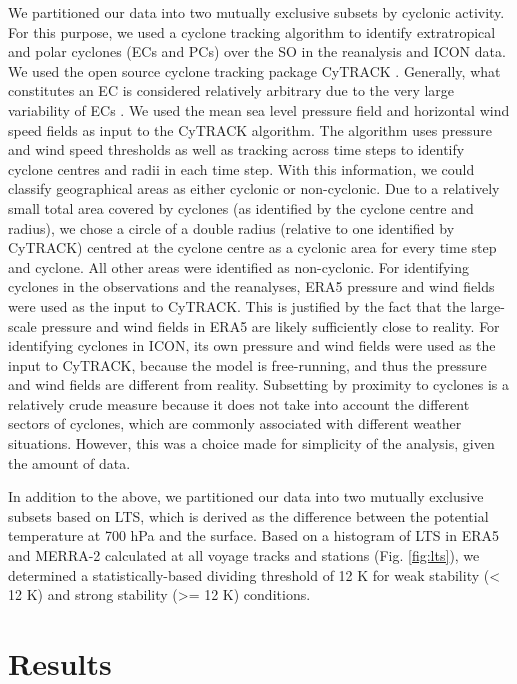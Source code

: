 \documentclass[draft]{agujournal2019}
\begin{document}
We partitioned our data into two mutually exclusive subsets by cyclonic
activity. For this purpose, we used a cyclone tracking algorithm to identify
extratropical and polar cyclones (ECs and PCs) over the SO in the reanalysis
and ICON data. We used the open source cyclone tracking package CyTRACK
.  Generally, what constitutes an EC is considered
relatively arbitrary due to the very large variability of ECs .
We used the mean sea level pressure field and horizontal wind speed fields as
input to the CyTRACK algorithm. The algorithm uses pressure and wind speed
thresholds as well as tracking across time steps to identify cyclone centres
and radii in each time step. With this information, we could classify
geographical areas as either cyclonic or non-cyclonic. Due to a relatively
small total area covered by cyclones (as identified by the cyclone centre and
radius), we chose a circle of a double radius (relative to one identified by
CyTRACK) centred at the cyclone centre as a cyclonic area for every time step
and cyclone. All other areas were identified as non-cyclonic. For identifying
cyclones in the observations and the reanalyses, ERA5 pressure and wind fields
were used as the input to CyTRACK.  This is justified by the fact that the
large-scale pressure and wind fields in ERA5 are likely sufficiently close to
reality. For identifying cyclones in ICON, its own pressure and wind fields
were used as the input to CyTRACK, because the model is free-running, and thus
the pressure and wind fields are different from reality. Subsetting by
proximity to cyclones is a relatively crude measure because it does not take
into account the different sectors of cyclones, which are commonly associated
with different weather situations. However, this was a choice made for
simplicity of the analysis, given the amount of data.

In addition to the above, we partitioned our data into two mutually exclusive
subsets based on LTS, which is derived as the difference between the potential
temperature at 700 hPa and the surface.  Based on a histogram of LTS in ERA5
and MERRA-2 calculated at all voyage tracks and stations (Fig.  \ref{fig:lts}),
we determined a statistically-based dividing threshold of 12 K for weak
stability (< 12 K) and strong stability (>= 12 K) conditions.

\section{Results}
\label{sec:results}
\end{document}
